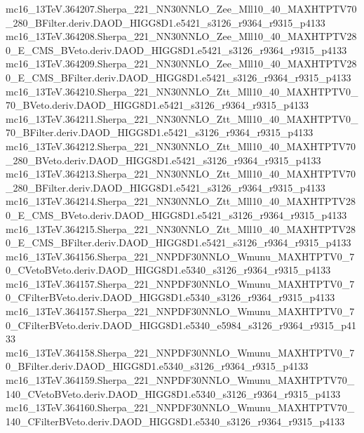 \begin{scriptsize}
mc16\_13TeV.364207.Sherpa\_221\_NN30NNLO\_Zee\_Mll10\_40\_MAXHTPTV70\_280\_BFilter.deriv.DAOD\_HIGG8D1.e5421\_s3126\_r9364\_r9315\_p4133 \\
mc16\_13TeV.364208.Sherpa\_221\_NN30NNLO\_Zee\_Mll10\_40\_MAXHTPTV280\_E\_CMS\_BVeto.deriv.DAOD\_HIGG8D1.e5421\_s3126\_r9364\_r9315\_p4133 \\
mc16\_13TeV.364209.Sherpa\_221\_NN30NNLO\_Zee\_Mll10\_40\_MAXHTPTV280\_E\_CMS\_BFilter.deriv.DAOD\_HIGG8D1.e5421\_s3126\_r9364\_r9315\_p4133 \\
mc16\_13TeV.364210.Sherpa\_221\_NN30NNLO\_Ztt\_Mll10\_40\_MAXHTPTV0\_70\_BVeto.deriv.DAOD\_HIGG8D1.e5421\_s3126\_r9364\_r9315\_p4133 \\
mc16\_13TeV.364211.Sherpa\_221\_NN30NNLO\_Ztt\_Mll10\_40\_MAXHTPTV0\_70\_BFilter.deriv.DAOD\_HIGG8D1.e5421\_s3126\_r9364\_r9315\_p4133 \\
mc16\_13TeV.364212.Sherpa\_221\_NN30NNLO\_Ztt\_Mll10\_40\_MAXHTPTV70\_280\_BVeto.deriv.DAOD\_HIGG8D1.e5421\_s3126\_r9364\_r9315\_p4133 \\
mc16\_13TeV.364213.Sherpa\_221\_NN30NNLO\_Ztt\_Mll10\_40\_MAXHTPTV70\_280\_BFilter.deriv.DAOD\_HIGG8D1.e5421\_s3126\_r9364\_r9315\_p4133 \\
mc16\_13TeV.364214.Sherpa\_221\_NN30NNLO\_Ztt\_Mll10\_40\_MAXHTPTV280\_E\_CMS\_BVeto.deriv.DAOD\_HIGG8D1.e5421\_s3126\_r9364\_r9315\_p4133 \\
mc16\_13TeV.364215.Sherpa\_221\_NN30NNLO\_Ztt\_Mll10\_40\_MAXHTPTV280\_E\_CMS\_BFilter.deriv.DAOD\_HIGG8D1.e5421\_s3126\_r9364\_r9315\_p4133 \\
mc16\_13TeV.364156.Sherpa\_221\_NNPDF30NNLO\_Wmunu\_MAXHTPTV0\_70\_CVetoBVeto.deriv.DAOD\_HIGG8D1.e5340\_s3126\_r9364\_r9315\_p4133 \\
mc16\_13TeV.364157.Sherpa\_221\_NNPDF30NNLO\_Wmunu\_MAXHTPTV0\_70\_CFilterBVeto.deriv.DAOD\_HIGG8D1.e5340\_s3126\_r9364\_r9315\_p4133 \\
mc16\_13TeV.364157.Sherpa\_221\_NNPDF30NNLO\_Wmunu\_MAXHTPTV0\_70\_CFilterBVeto.deriv.DAOD\_HIGG8D1.e5340\_e5984\_s3126\_r9364\_r9315\_p4133 \\
mc16\_13TeV.364158.Sherpa\_221\_NNPDF30NNLO\_Wmunu\_MAXHTPTV0\_70\_BFilter.deriv.DAOD\_HIGG8D1.e5340\_s3126\_r9364\_r9315\_p4133 \\
mc16\_13TeV.364159.Sherpa\_221\_NNPDF30NNLO\_Wmunu\_MAXHTPTV70\_140\_CVetoBVeto.deriv.DAOD\_HIGG8D1.e5340\_s3126\_r9364\_r9315\_p4133 \\
mc16\_13TeV.364160.Sherpa\_221\_NNPDF30NNLO\_Wmunu\_MAXHTPTV70\_140\_CFilterBVeto.deriv.DAOD\_HIGG8D1.e5340\_s3126\_r9364\_r9315\_p4133 \\

\end{scriptsize}

